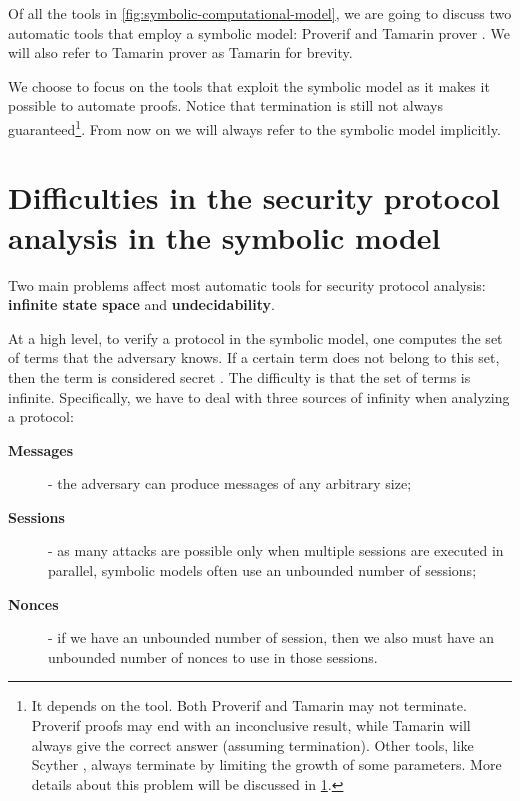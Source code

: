 Of all the tools in \cref{fig:symbolic-computational-model}, we are going to discuss two automatic tools that employ a symbolic model: Proverif \cite{ProverifWebSite} and Tamarin prover \cite{TamarinWebSite}. We will also refer to Tamarin prover as Tamarin for brevity.

We choose to focus on the tools that exploit the symbolic model as it makes it possible to automate proofs. Notice that termination is still not always guaranteed\footnote{It depends on the tool. Both Proverif and Tamarin may not terminate. Proverif proofs may end with an inconclusive result, while Tamarin will always give the correct answer (assuming termination). Other tools, like Scyther \cite{Scyther}, always terminate by limiting the growth of some parameters. More details about this problem will be discussed in \cref{sec:difficulties-analysis-symbolic}.}. From now on we will always refer to the symbolic model implicitly.

\section{Difficulties in the security protocol analysis in the symbolic model}
\label{sec:difficulties-analysis-symbolic}
Two main problems affect most automatic tools for security protocol analysis: \textbf{infinite state space} and \textbf{undecidability}.

At a high level, to verify a protocol in the symbolic model, one computes the set of terms that the adversary knows. If a certain term does not belong to this set, then the term is considered secret \cite{SymbolicVerificationBlanchet}. The difficulty is that the set of terms is infinite. Specifically, we have to deal with three sources of infinity when analyzing a protocol:
\begin{description}
    \item[\textbf{Messages}] - the adversary can produce messages of any arbitrary size;
    \item[\textbf{Sessions}] - as many attacks are possible only when multiple sessions are executed in parallel, symbolic models often use an unbounded number of sessions;
    \item[\textbf{Nonces}] - if we have an unbounded number of session, then we also must have an unbounded number of nonces to use in those sessions.
\end{description}

